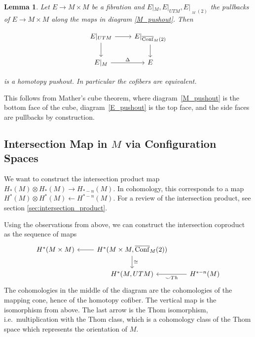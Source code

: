 \documentclass{scrartcl}
\theoremstyle{plain}
\newtheorem{lemma}[theorem]{Lemma}
\theoremstyle{definition}
\newcommand{\cupp}{\mathbin{\smile}}
\newcommand{\iso}{\cong}
\newcommand{\from}{\leftarrow}
\DeclareMathOperator{\cConf}{\overline{Conf}}
\begin{document}
\begin{lemma}\label{lemma_pullback_cube}
    Let $E\to M\times M$ be a fibration and $E|_M, E|_{UTM}, E|_{\cConf_M(2)}$ the pullbacks of $E\to M\times M$ along the maps in diagram \ref{M_pushout}. Then

    \begin{equation} \label{E_pushout}
    \begin{tikzcd}
        E|_{UTM} \dar\rar & E|_{\cConf_M(2)}\dar \\
        E|_{M} \rar["\Delta"] & E
    \end{tikzcd}
    \end{equation}
    
    is a homotopy pushout. In particular the cofibers are equivalent.    
\end{lemma}
This follows from Mather's cube theorem, where diagram~\ref{M_pushout} is the bottom face of the cube, diagram~\ref{E_pushout} is the top face, and the side faces are pullbacks by construction. %


\subsection[Intersection Map via Configuration Spaces]{Intersection Map in $M$ via Configuration Spaces}\label{subsec:intersection-in-M-via-conf}

We want to construct the intersection product map $H_*(M) \otimes H_*(M) \to H_{*-n}(M)$. In cohomology, this corresponds to a map $H^*(M) \otimes H^*(M) \from H^{*-n}(M)$. For a review of the intersection product, see section \ref{sec:intersection_product}.

Using the observations from above, we can construct the intersection coproduct as the sequence of maps
\begin{equation}
\begin{tikzcd}
    H^*(M\times M) & \lar H^*(M\times M, \cConf_M(2)) \dar["\iso"] & \ \\
    & H^*(M, UTM)& \lar["\cupp Th"] H^{*-n}(M)
\end{tikzcd}
\end{equation}
The cohomologies in the middle of the diagram are the cohomologies of the mapping cone, hence of the homotopy cofiber. The vertical map is the isomorphism from above. The last arrow is the Thom isomorphism, i.e.\ multiplication with the Thom class, which is a cohomology class of the Thom space which represents the orientation of $M$. %
\end{document}

